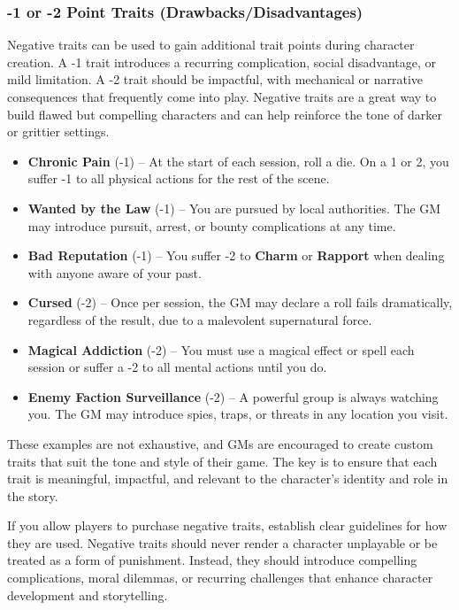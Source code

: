 \subsubsection{-1 or -2 Point Traits (Drawbacks/Disadvantages)}

Negative traits can be used to gain additional trait points during character creation. A -1 trait introduces a recurring complication, social disadvantage, or mild limitation. A -2 trait should be impactful, with mechanical or narrative consequences that frequently come into play. Negative traits are a great way to build flawed but compelling characters and can help reinforce the tone of darker or grittier settings.

    \begin{itemize}
        \item \textbf{Chronic Pain} (-1) – At the start of each session, roll a die. On a 1 or 2, you suffer -1 to all physical actions for the rest of the scene.
        \item \textbf{Wanted by the Law} (-1) – You are pursued by local authorities. The GM may introduce pursuit, arrest, or bounty complications at any time.
        \item \textbf{Bad Reputation} (-1) – You suffer -2 to \textbf{Charm} or \textbf{Rapport} when dealing with anyone aware of your past.
        \item \textbf{Cursed} (-2) – Once per session, the GM may declare a roll fails dramatically, regardless of the result, due to a malevolent supernatural force.
        \item \textbf{Magical Addiction} (-2) – You must use a magical effect or spell each session or suffer a -2 to all mental actions until you do.
        \item \textbf{Enemy Faction Surveillance} (-2) – A powerful group is always watching you. The GM may introduce spies, traps, or threats in any location you visit.
    \end{itemize}

These examples are not exhaustive, and GMs are encouraged to create custom traits that suit the tone and style of their game. The key is to ensure that each trait is meaningful, impactful, and relevant to the character’s identity and role in the story.

If you allow players to purchase negative traits, establish clear guidelines for how they are used. Negative traits should never render a character unplayable or be treated as a form of punishment. Instead, they should introduce compelling complications, moral dilemmas, or recurring challenges that enhance character development and storytelling.

